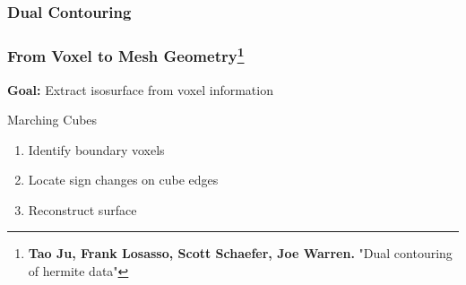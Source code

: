 
\subsubsection{Dual Contouring}

\begin{frame}
\frametitle{From Voxel to Mesh Geometry\footnote{\textbf{Tao Ju, Frank Losasso, Scott Schaefer, Joe Warren.} "Dual contouring of hermite data"}}
\vspace{-0.3cm}
\begin{center}
	\textbf{Goal:} Extract isosurface from voxel information	
\end{center}
\vspace{-0.5cm}	
\begin{minipage}[t]{0.4\linewidth}
	\begin{block}{Marching Cubes}
		\begin{enumerate}
			\item<2-> Identify boundary voxels
			\item<3-> Locate sign changes on cube edges
			\item<4-> Reconstruct surface
		\end{enumerate}
	\end{block}
\end{minipage}
\end{frame}
